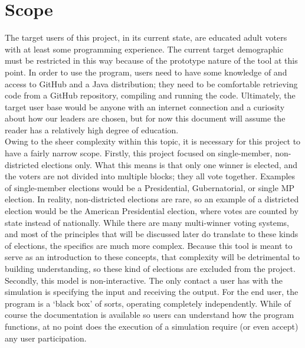 \documentclass[12pt]{article}
\begin{document}
\section{Scope} \label{Scope}
\qquad The target users of this project, in its current state, are educated adult voters with at least some programming experience. The current target demographic must be restricted in this way because of the prototype nature of the tool at this point. In order to use the program, users need to have some knowledge of and access to GitHub and a Java distribution; they need to be comfortable retrieving code from a GitHub repository, compiling and running the code. Ultimately, the target user base would be anyone with an internet connection and a curiosity about how our leaders are chosen, but for now this document will assume the reader has a relatively high degree of education. \\

\qquad Owing to the sheer complexity within this topic, it is necessary for this project to have a fairly narrow scope. Firstly, this project focused on single-member, non-districted elections only. What this means is that only one winner is elected, and the voters are not divided into multiple blocks; they all vote together. Examples of single-member elections would be a Presidential, Gubernatorial, or single MP election. In reality, non-districted elections are rare, so an example of a districted election would be the American Presidential election, where votes are counted by state instead of nationally. While there are many multi-winner voting systems, and most of the principles that will be discussed later do translate to these kinds of elections, the specifics are much more complex. Because this tool is meant to serve as an introduction to these concepts, that complexity will be detrimental to building understanding, so these kind of elections are excluded from the project. \\

\qquad Secondly, this model is non-interactive. The only contact a user has with the simulation is specifying the input and receiving the output. For the end user, the program is a `black box' of sorts, operating completely independently. While of course the documentation is available so users can understand how the program functions, at no point does the execution of a simulation require (or even accept) any user participation. \\
\end{document}
